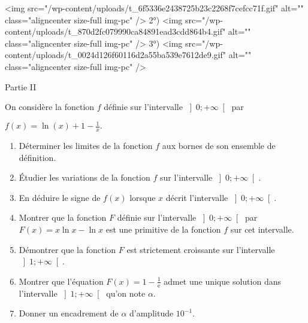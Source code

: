 \begin{enumerate}
\begin{center}
\begin{extern}
{
      }
   \end{extern}
\end{center}
<img src="/wp-content/uploads/t_6f5336e2438725b23c2268f7cefcc71f.gif" alt="" class="aligncenter size-full  img-pc" />
     2°)
     <img src="/wp-content/uploads/t_870d2fc079990ca84891ead3cdd864b4.gif" alt="" class="aligncenter size-full  img-pc" />
     3°)
     <img src="/wp-content/uploads/t_0024d126f60116d2a55ba539e7612de9.gif" alt="" class="aligncenter size-full  img-pc" />
\end{enumerate}
\begin{h3}Partie II \end{h3}
On considère la fonction $f$ définie sur l'intervalle $\left]0; +\infty \right[$ par
\par
$f\left(x\right)=\ln \left(x\right)+1-\frac{1}{x}.$
\begin{enumerate}
     \item
     Déterminer les limites de la fonction $f$ aux bornes de son ensemble de définition.
     \item
     Étudier les variations de la fonction $f$ sur l'intervalle $\left]0; +\infty \right[$.
     \item
     En déduire le signe de $f\left(x\right)$ lorsque $x$ décrit l'intervalle $\left]0; +\infty \right[$.
     \item
     Montrer que la fonction $F$ définie sur l'intervalle $\left]0; +\infty \right[$ par $F\left(x\right)=x \ln x-\ln x$ est une primitive de la fonction $f$ sur cet intervalle.
     \item
     Démontrer que la fonction $F$ est strictement croissante sur l'intervalle $\left]1; +\infty \right[$.
     \item
     Montrer que l'équation $F\left(x\right)=1-\frac{1}{\text{e}}$ admet une unique solution dans l'intervalle $\left]1;+\infty \right[$ qu'on note $\alpha $.
     \item
     Donner un encadrement de $\alpha $ d'amplitude $10^{-1}$.
\end{enumerate}
